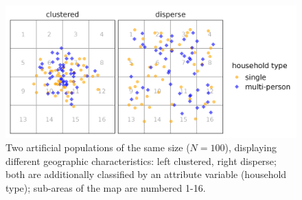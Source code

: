 \begin{figure}[H]
    \centering
    \includegraphics[width=\linewidth]{figures/ExaMap_clus_disp.png}
    \caption{Two artificial populations of the same size ($N = 100$), displaying different geographic characteristics: left clustered, right disperse; both are additionally classified by an attribute variable (household type); sub-areas of the map are numbered 1-16.}
    \label{fig:ExaDispClus}
\end{figure}

